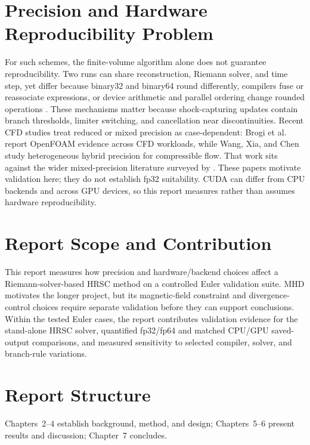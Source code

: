 \section{Precision and Hardware Reproducibility Problem}
For such schemes, the finite-volume algorithm alone does not guarantee reproducibility. Two runs can share reconstruction, Riemann solver, and time step, yet differ because binary32 and binary64 round differently, compilers fuse or reassociate expressions, or device arithmetic and parallel ordering change rounded operations \citep{goldberg_1991,ieee754_2019}. These mechanisms matter because shock-capturing updates contain branch thresholds, limiter switching, and cancellation near discontinuities. Recent CFD studies treat reduced or mixed precision as case-dependent: Brogi et al. report OpenFOAM evidence across CFD workloads, while Wang, Xia, and Chen study heterogeneous hybrid precision for compressible flow. That work sits against the wider mixed-precision literature surveyed by \citet{higham_mary_2022} \citep{brogi_etal_2024,wang_xia_chen_2025}. These papers motivate validation here; they do not establish fp32 suitability. CUDA can differ from CPU backends and across GPU devices, so this report measures rather than assumes hardware reproducibility.

\section{Report Scope and Contribution}
This report measures how precision and hardware/backend choices affect a
Riemann-solver-based HRSC method on a controlled Euler validation suite. MHD
motivates the longer project, but its magnetic-field constraint and
divergence-control choices require separate validation before they can support
conclusions. Within the tested Euler cases, the report contributes validation
evidence for the stand-alone HRSC solver, quantified fp32/fp64 and matched
CPU/GPU saved-output comparisons, and measured sensitivity to selected compiler,
solver, and branch-rule variations.

\section{Report Structure}
Chapters~2--4 establish background, method, and design; Chapters~5--6 present results and discussion; Chapter~7 concludes.
